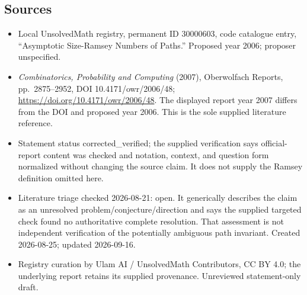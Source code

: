 \documentclass[11pt]{article}
\begin{document}
\subsection{Sources}
\begin{itemize}
\item Local UnsolvedMath registry, permanent ID 30000603, code catalogue entry, ``Asymptotic Size-Ramsey Numbers of Paths.'' Proposed year 2006; proposer unspecified.
\item \emph{Combinatorics, Probability and Computing} (2007), Oberwolfach Reports, pp.\ 2875--2952, DOI 10.4171/owr/2006/48; \url{https://doi.org/10.4171/owr/2006/48}. The displayed report year 2007 differs from the DOI and proposed year 2006. This is the sole supplied literature reference.
\item Statement status corrected\_verified; the supplied verification says official-report content was checked and notation, context, and question form normalized without changing the source claim. It does not supply the Ramsey definition omitted here.
\item Literature triage checked 2026-08-21: open. It generically describes the claim as an unresolved problem/conjecture/direction and says the supplied targeted check found no authoritative complete resolution. That assessment is not independent verification of the potentially ambiguous path invariant. Created 2026-08-25; updated 2026-09-16.
\item Registry curation by Ulam AI / UnsolvedMath Contributors, CC BY 4.0; the underlying report retains its supplied provenance. Unreviewed statement-only draft.
\end{itemize}
\end{document}
